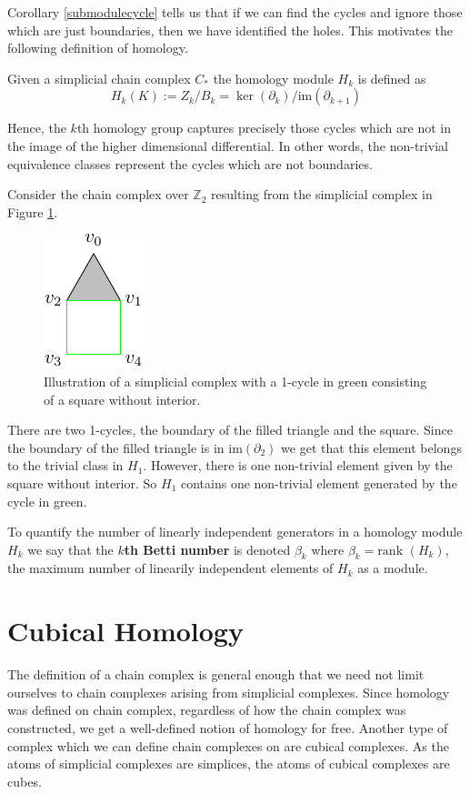  Corollary \ref{submodulecycle} tells us that if we can find the cycles and ignore those which are just boundaries, then we have identified the holes. This motivates the following definition of homology.
\begin{definition}
  Given a simplicial chain complex \hspace{0.05cm}$C_{*}$ the homology module $H_{k}$ is defined as
  \[H_{k}(K) := Z_{k} / B_{k} = \ker(\partial_{k})/\text{im}(\partial_{k+1})\]
\end{definition}
Hence, the $k$th homology group captures precisely those cycles which are not in the image of the higher dimensional differential. In other words, the non-trivial equivalence classes represent the cycles which are not boundaries.
\begin{example}
Consider the chain complex over $\mathbb{Z}_{2}$ resulting from the simplicial complex in Figure \ref{trihom}.
\begin{figure}[ht]
  \centering
  \includegraphics[scale=2]{trisquarefilled.pdf}
  \caption{\label{trihom} Illustration of a simplicial complex with a 1-cycle in green consisting of a square without interior.}
\end{figure}
There are two 1-cycles, the boundary of the filled triangle and the square. Since the boundary of the filled triangle is in $\text{im} (\partial_{2})$ we get that this element belongs to the trivial class in $H_{1}$. However, there is one non-trivial element given by the square without interior. So $H_{1}$ contains one non-trivial element generated by the cycle in green.

To quantify the number of linearly independent generators in a homology module $H_{k}$ we say that the \textbf{$k$th Betti number} is denoted $\beta_{k}$ where $\beta_{k} = \text{rank }(H_{k})$, the maximum number of linearily independent elements of $H_{k}$ as a module.

\section{Cubical Homology}
The definition of a chain complex is general enough that we need not limit ourselves to chain complexes arising from simplicial complexes. Since homology was defined on chain complex, regardless of how the chain complex was constructed, we get a well-defined notion of homology for free. Another type of complex which we can define chain complexes on are cubical complexes. As the atoms of simplicial complexes are simplices, the atoms of cubical complexes are cubes.


\end{example}
